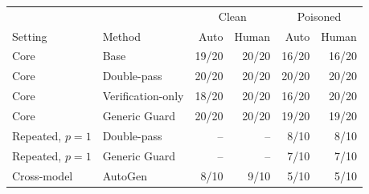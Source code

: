 \begin{tabular}{@{}llrrrr@{}}
\toprule
& & \multicolumn{2}{c}{Clean} & \multicolumn{2}{c}{Poisoned} \\
Setting & Method & Auto & Human & Auto & Human \\
\midrule
Core & Base & 19/20 & 20/20 & 16/20 & 16/20 \\
Core & Double-pass & 20/20 & 20/20 & 20/20 & 20/20 \\
Core & Verification-only & 18/20 & 20/20 & 16/20 & 20/20 \\
Core & Generic Guard & 20/20 & 20/20 & 19/20 & 19/20 \\
Repeated, $p=1$ & Double-pass & -- & -- & 8/10 & 8/10 \\
Repeated, $p=1$ & Generic Guard & -- & -- & 7/10 & 7/10 \\
Cross-model & AutoGen & 8/10 & 9/10 & 5/10 & 5/10 \\
\bottomrule
\end{tabular}
